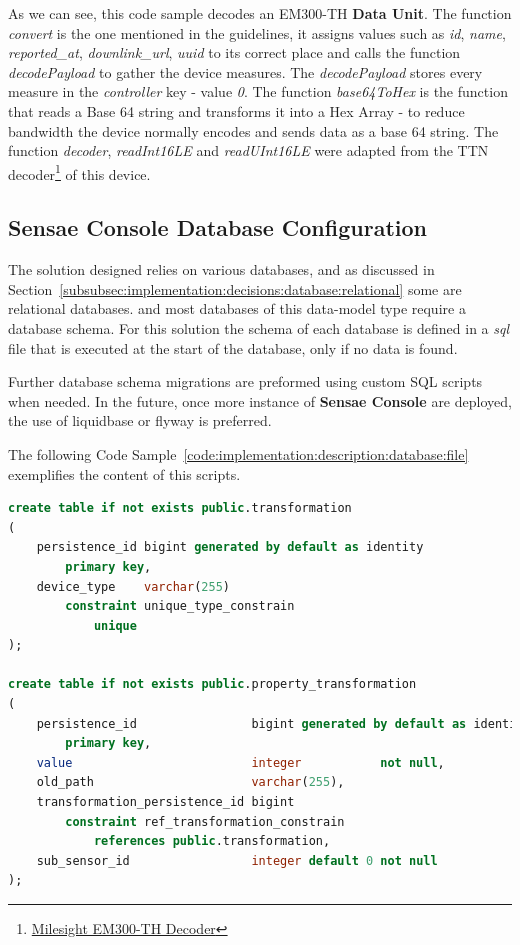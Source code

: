 As we can see, this code sample decodes an EM300-TH \textbf{Data Unit}. The function \textit{convert} is the one mentioned in the guidelines, it assigns values such as \textit{id}, \textit{name}, \textit{reported\_at}, \textit{downlink\_url}, \textit{uuid} to its correct place and calls the function \textit{decodePayload} to gather the device measures. The \textit{decodePayload} stores every measure in the \textit{controller} key - value \textit{0}. The function \textit{base64ToHex} is the function that reads a Base 64 string and transforms it into a Hex Array - to reduce bandwidth the device normally encodes and sends data as a base 64 string. The function \textit{decoder}, \textit{readInt16LE} and \textit{readUInt16LE} were adapted from the TTN decoder\footnote{\href {https://www.milesight-iot.com/lorawan/sensor/em300-th}{Milesight EM300-TH Decoder}} of this device.

\subsection{Sensae Console Database Configuration}
\label{subsec:implementation:description:database}

The solution designed relies on various databases, and as discussed in Section~\ref{subsubsec:implementation:decisions:database:relational} some are relational databases.  and most databases of this data-model type require a database schema. For this solution the schema of each database is defined in a \textit{sql} file that is executed at the start of the database, only if no data is found. 

Further database schema migrations are preformed using custom \gls{SQL} scripts when needed. In the future, once more instance of \textbf{Sensae Console} are deployed, the use of liquidbase or flyway is preferred.

The following Code Sample~\ref{code:implementation:description:database:file} exemplifies the content of this scripts.

\begin{lstlisting}[language=SQL, caption=Initialization Script Segment for Data Processor Database, label={code:implementation:description:database:file}]
create table if not exists public.transformation
(
    persistence_id bigint generated by default as identity
        primary key,
    device_type    varchar(255)
        constraint unique_type_constrain
            unique
);

create table if not exists public.property_transformation
(
    persistence_id                bigint generated by default as identity (maxvalue 2147483647)
        primary key,
    value                         integer           not null,
    old_path                      varchar(255),
    transformation_persistence_id bigint
        constraint ref_transformation_constrain
            references public.transformation,
    sub_sensor_id                 integer default 0 not null
);
\end{lstlisting}

